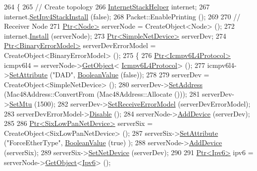 \begin{DoxyCode}
264 \{
265   \textcolor{comment}{// Create topology}
266   \hyperlink{classns3_1_1InternetStackHelper}{InternetStackHelper} internet;
267   internet.\hyperlink{classns3_1_1InternetStackHelper_a10e2a35f410d0d1c90d979542c8bfd6e}{SetIpv4StackInstall} (\textcolor{keyword}{false});
268   Packet::EnablePrinting ();
269 
270   \textcolor{comment}{// Receiver Node}
271   \hyperlink{classns3_1_1Ptr}{Ptr<Node>} serverNode = CreateObject<Node> ();
272   internet.\hyperlink{classns3_1_1InternetStackHelper_a6645b412f31283d2d9bc3d8a95cebbc0}{Install} (serverNode);
273   \hyperlink{classns3_1_1Ptr}{Ptr<SimpleNetDevice>} serverDev;
274   \hyperlink{classns3_1_1Ptr}{Ptr<BinaryErrorModel>} serverDevErrorModel = CreateObject<BinaryErrorModel> ();
275   \{
276     \hyperlink{classns3_1_1Ptr}{Ptr<Icmpv6L4Protocol>} icmpv6l4 = serverNode->\hyperlink{classns3_1_1Object_a13e18c00017096c8381eb651d5bd0783}{GetObject}<
      \hyperlink{classns3_1_1Icmpv6L4Protocol}{Icmpv6L4Protocol}> ();
277     icmpv6l4->\hyperlink{classns3_1_1ObjectBase_ac60245d3ea4123bbc9b1d391f1f6592f}{SetAttribute} (\textcolor{stringliteral}{"DAD"}, \hyperlink{classns3_1_1BooleanValue}{BooleanValue} (\textcolor{keyword}{false}));
278 
279     serverDev = CreateObject<SimpleNetDevice> ();
280     serverDev->\hyperlink{classns3_1_1SimpleNetDevice_a968ef3e7318bac29d5f1d7d977029af4}{SetAddress} (Mac48Address::ConvertFrom (Mac48Address::Allocate ()));
281     serverDev->\hyperlink{classns3_1_1SimpleNetDevice_ab41676e626a91832291bcfbd55ee454a}{SetMtu} (1500);
282     serverDev->\hyperlink{classns3_1_1SimpleNetDevice_a8674cbc75fa8504bbf6c27b2ca1f5129}{SetReceiveErrorModel} (serverDevErrorModel);
283     serverDevErrorModel->\hyperlink{classns3_1_1ErrorModel_a55d35a3e713c31f650577e9f96cf25c0}{Disable} ();
284     serverNode->\hyperlink{classns3_1_1Node_a42ff83ee1d5d1649c770d3f5b62375de}{AddDevice} (serverDev);
285 
286     \hyperlink{classns3_1_1Ptr}{Ptr<SixLowPanNetDevice>} serverSix = CreateObject<SixLowPanNetDevice> ();
287     serverSix->\hyperlink{classns3_1_1ObjectBase_ac60245d3ea4123bbc9b1d391f1f6592f}{SetAttribute} (\textcolor{stringliteral}{"ForceEtherType"}, \hyperlink{classns3_1_1BooleanValue}{BooleanValue} (\textcolor{keyword}{true}) );
288     serverNode->\hyperlink{classns3_1_1Node_a42ff83ee1d5d1649c770d3f5b62375de}{AddDevice} (serverSix);
289     serverSix->\hyperlink{classns3_1_1SixLowPanNetDevice_a81c74a5dc06e3fbad1a8b1c59d1f68fa}{SetNetDevice} (serverDev);
290 
291     \hyperlink{classns3_1_1Ptr}{Ptr<Ipv6>} ipv6 = serverNode->\hyperlink{classns3_1_1Object_a13e18c00017096c8381eb651d5bd0783}{GetObject}<\hyperlink{classns3_1_1Ipv6}{Ipv6}> ();

\end{DoxyCode}

